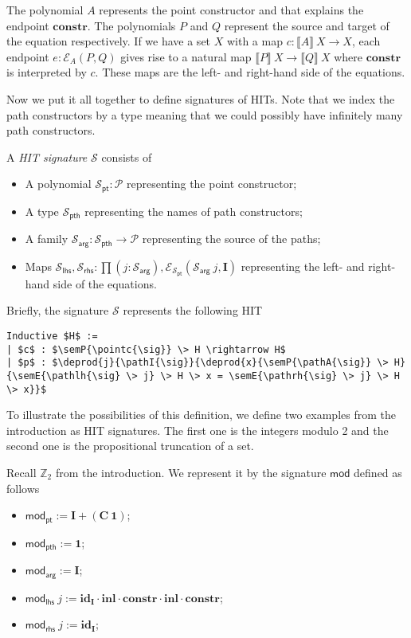 \documentclass[9pt]{entcs}
\newcommand{\constructor}[1]{\mathbf{#1}}
\newcommand{\function}[1]{\mathsf{#1}}
\newcommand{\deprod}[3]{\prod(#1 : #2), #3} %
\newcommand{\0}{\textbf{0}} %
\newcommand{\unitt}{\textbf{1}} %
\newcommand{\Def}{:=} %
\newcommand{\poly}{\mathcal{P}} %
\newcommand{\C}{\constructor{C}} %
\newcommand{\I}{\constructor{I}} %
\newcommand{\sumP}[2]{#1 + #2} %
\newcommand{\ep}[3]{\mathcal{E}_{#1}(#2,#3)} %
\newcommand{\id}[1]{\constructor{id}_{#1}} %
\newcommand{\comp}[2]{#1 \cdot #2} %
\newcommand{\inle}{\constructor{inl}} %
\newcommand{\constr}{\constructor{constr}} %
\newcommand{\pt}[0]{\textsf{pt}}
\newcommand{\pthI}[0]{\textsf{pth}}
\newcommand{\pthA}[0]{\textsf{arg}}
\newcommand{\pthlh}[0]{\textsf{lhs}}
\newcommand{\pthrh}[0]{\textsf{rhs}}
\newcommand{\pointc}[1]{#1_{\pt}} %
\newcommand{\pathI}[1]{#1_{\pthI}} %
\newcommand{\pathA}[1]{#1_{\pthA}} %
\newcommand{\pathlh}[1]{#1_{\pthlh}} %
\newcommand{\pathrh}[1]{#1_{\pthrh}} %
\newcommand{\modsig}{\function{mod}} %
\newcommand{\sig}{\mathcal{S}} %
\newcommand{\semP}[1]{\llbracket #1 \rrbracket} %
\newcommand{\semE}[1]{\llbracket #1 \rrbracket} %
\newcommand{\modZ}{\mathbb{Z}_2} %
\begin{document}
The polynomial $A$ represents the point constructor and that explains the endpoint $\constr$.
The polynomials $P$ and $Q$ represent the source and target of the equation respectively.
If we have a set $X$ with a map $c : \semP{A} \> X \rightarrow X$, each endpoint $e : \ep{A}{P}{Q}$ gives rise to a natural map $\semP{P} \> X \rightarrow \semP{Q} \> X$ where $\constr$ is interpreted by $c$.
These maps are the left- and right-hand side of  the equations.

Now we put it all together to define signatures of HITs.
Note that we index the path constructors by a type meaning that we could possibly have infinitely many path constructors.

\begin{definition}
\label{def:signature}
A \emph{HIT signature} $\sig$ consists of
\begin{itemize}
	\item A polynomial $\pointc{\sig} : \poly$ representing the point constructor;
	\item A type $\pathI{\sig}$ representing the names of path constructors;
	\item A family $\pathA{\sig} : \pathI{\sig} \rightarrow \poly$ representing the source of the paths;
	\item Maps $\pathlh{\sig}, \pathrh{\sig} : \deprod{j}{\pathA{\sig}}{\ep{\pointc{\sig}}{\pathA{\sig} \> j}{\I}}$ representing the left- and right-hand side of the equations.
\end{itemize}
\end{definition}

Briefly, the signature $\sig$ represents the following HIT

\begin{lstlisting}[mathescape=true]
Inductive $H$ :=
| $c$ : $\semP{\pointc{\sig}} \> H \rightarrow H$
| $p$ : $\deprod{j}{\pathI{\sig}}{\deprod{x}{\semP{\pathA{\sig}} \> H}{\semE{\pathlh{\sig} \> j} \> H \> x = \semE{\pathrh{\sig} \> j} \> H \> x}}$
\end{lstlisting}

To illustrate the possibilities of this definition, we define two examples from the introduction as HIT signatures.
The first one is the integers modulo 2 and the second one is the propositional truncation of a set.

\begin{example}
\label{ex:modsig}
Recall $\modZ$ from the introduction.
We represent it by the signature $\modsig$ defined as follows
\begin{itemize}
	\item $\pointc{\modsig} \Def \sumP{\I}{(\C \> \unitt)}$;
	\item $\pathI{\modsig} \Def \unitt$;
	\item $\pathA{\modsig} \Def \I$;
	\item $\pathlh{\modsig} \> j \Def \comp{\comp{\comp{\comp{\id{\I}}{\inle}}{\constr}}{\inle}}{\constr}$;
	\item $\pathrh{\modsig} \> j \Def \id{\I}$;
\end{itemize}
\end{example}
\end{document}
